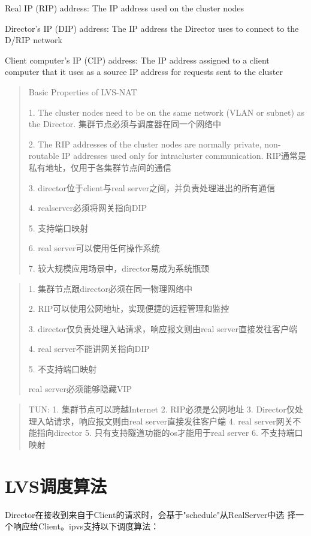 Real IP (RIP) address: The IP address used on the cluster nodes

Director's IP (DIP) address: The IP address the Director uses to
connect to the D/RIP network

Client computer's IP (CIP) address: The IP address assigned to a
client computer that it uses as a source IP address for requests sent
to the cluster

\begin{quote}
  Basic Properties of LVS-NAT 

1. The cluster nodes need to be on the
same network (VLAN or subnet) as the Director.
集群节点必须与调度器在同一个网络中


2. The RIP addresses of the cluster nodes are normally private,
non-routable IP addresses used only for intracluster communication.
RIP通常是私有地址，仅用于各集群节点间的通信

3. director位于client与real server之间，并负责处理进出的所有通信

4. realserver必须将网关指向DIP

5. 支持端口映射

6. real server可以使用任何操作系统

7. 较大规模应用场景中，director易成为系统瓶颈
\end{quote}

\begin{quote}
  1. 集群节点跟director必须在同一物理网络中

  2. RIP可以使用公网地址，实现便捷的远程管理和监控

  3. director仅负责处理入站请求，响应报文则由real server直接发往客户端

  4. real server不能讲网关指向DIP

  5. 不支持端口映射

  real server必须能够隐藏VIP
\end{quote}

\begin{quote}
  TUN:
  1. 集群节点可以跨越Internet
  2. RIP必须是公网地址
  3. Director仅处理入站请求，响应报文则由real server直接发往客户端
  4. real server网关不能指向director
  5. 只有支持隧道功能的os才能用于real server
  6. 不支持端口映射
\end{quote}


\section{LVS调度算法}

Director在接收到来自于Client的请求时，会基于"schedule"从RealServer中选
择一个响应给Client。ipvs支持以下调度算法：

